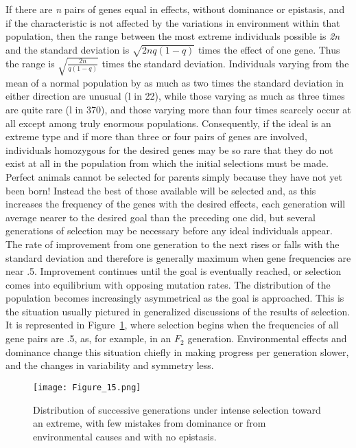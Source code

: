 If there are \textit{n} pairs of genes equal in effects, without dominance or
epistasis, and if the characteristic is not affected by the variations in
environment within that population, then the range between the most
extreme individuals possible is \textit{2n} and the standard deviation is
$\sqrt{2nq(1-q)}$ times the effect of one gene. Thus the range is
$\sqrt{\frac{2n}{q(1-q)}}$ times the standard deviation. Individuals varying from the
mean of a normal population by as much as two times the standard
deviation in either direction are unusual (l in 22), while those varying
as much as three times are quite rare (l in 370), and those varying more
than four times scarcely occur at all except among truly enormous
populations. Consequently, if the ideal is an extreme type and if more
than three or four pairs of genes are involved, individuals homozygous
for the desired genes may be so rare that they do not exist at all in the
population from which the initial selections must be made. Perfect animals
cannot be selected for parents simply because they have not yet
been born! Instead the best of those available will be selected and, as
this increases the frequency of the genes with the desired effects, each
generation will average nearer to the desired goal than the preceding
one did, but several generations of selection may be necessary before
any ideal individuals appear. The rate of improvement from one generation
to the next rises or falls with the standard deviation and therefore
is generally maximum when gene frequencies are near .5. Improvement
continues until the goal is eventually reached, or selection comes
into equilibrium with opposing mutation rates. The distribution of
the population becomes increasingly asymmetrical as the goal is
approached. This is the situation usually pictured in generalized discussions
of the results of selection. It is represented in Figure~\ref{fig:Lush_Figure_15},
where selection begins when the frequencies of all gene pairs are .5, as, for
example, in an $F_2$ generation. Environmental effects and dominance
change this situation chiefly in making progress per generation slower,
and the changes in variability and symmetry less.

\begin{figure}
	\centering
    \texttt{[image: Figure\_15.png]}
    \caption{Distribution of successive generations under intense selection toward an
			 extreme, with few mistakes from dominance or from environmental causes and with
			 no epistasis.}
    \label{fig:Lush_Figure_15}
\end{figure}

